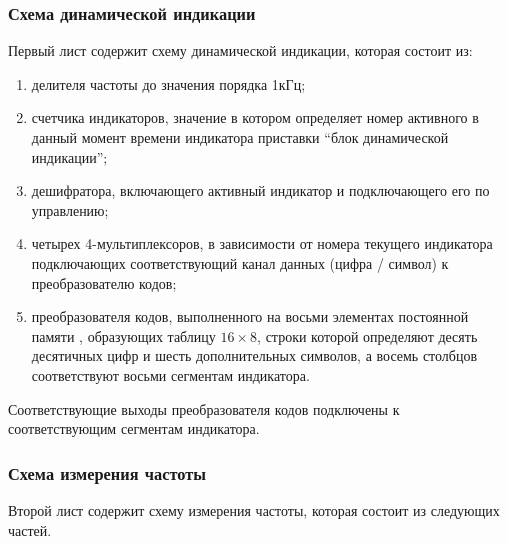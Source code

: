 \subsubsection{Схема динамической индикации}

Первый лист содержит схему динамической индикации, которая состоит из:

\begin{enumerate}[label=\asbuk*)]

\item делителя частоты до значения порядка 1кГц;

\item счетчика индикаторов, значение в котором определяет номер активного в данный момент времени индикатора приставки \enquote{блок динамической индикации};

\item дешифратора, включающего активный индикатор и подключающего его по управлению;

\item четырех 4-мультиплексоров, в зависимости от номера текущего индикатора подключающих соответствующий канал данных (цифра / символ) к преобразователю кодов;

\item преобразователя кодов, выполненного на восьми элементах постоянной памяти , образующих таблицу $16 \times 8$, строки которой определяют десять десятичных цифр и шесть дополнительных символов, а восемь столбцов соответствуют восьми сегментам индикатора.

\end{enumerate}

Соответствующие выходы преобразователя кодов подключены к соответствующим сегментам индикатора.

\subsubsection{Схема измерения частоты}

Второй лист содержит схему измерения частоты, которая состоит из следующих частей.

